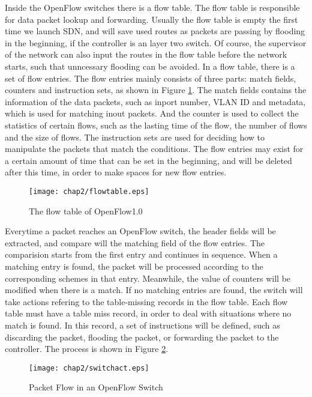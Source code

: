 Inside the OpenFlow switches there is a flow table. The flow table is responsible for data packet lookup and forwarding. Usually the flow table is empty the first time we launch SDN, and will save used routes as packets are passing by flooding in the beginning, if the controller is an layer two switch. Of course, the supervisor of the network can also input the routes in the flow table before the network starts, such that unncessary flooding can be avoided. In a flow table, there is a set of flow entries. The flow entries mainly consists of three parts: match fields, counters and instruction sets, as shown in Figure \ref{flowtable}. The match fields contains the information of the data packets, such as inport number, VLAN ID and metadata, which is used for matching inout packets. And the counter is used to collect the statistics of certain flows, such as the lasting time of the flow, the number of flows and the size of flows. The instruction sets are used for deciding how to manipulate the packets that match the conditions. The flow entries may exist for a certain amount of time that can be set in the beginning, and will be deleted after this time, in order to make spaces for new flow entries.

\begin{figure}[htbp]
  \centering
  \texttt{[image: chap2/flowtable.eps]}
  \caption{The flow table of OpenFlow1.0}\label{flowtable}
\end{figure}

Everytime a packet reaches an OpenFlow switch, the header fields will be extracted, and compare will the matching field of the flow entries. The comparision starts from the first entry and continues in sequence. When a matching entry is found, the packet will be processed according to the corresponding schemes in that entry. Meanwhile, the value of counters will be modified when there is a match. If no matching entries are found, the switch will take actions refering to the table-missing records in the flow table. Each flow table must have a table miss record, in order to deal with situations where no match is found. In this record, a set of instructions will be defined, such as discarding the packet, flooding the packet, or forwarding the packet to the controller. The process is shown in Figure \ref{switchact}.

\begin{figure}[htbp]
  \centering
  \texttt{[image: chap2/switchact.eps]}
  \caption{Packet Flow in an OpenFlow Switch}\label{switchact}
\end{figure}

